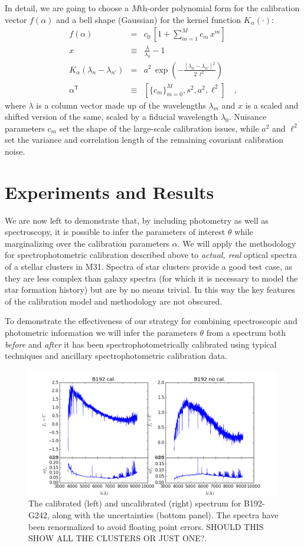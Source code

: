\documentclass[iop,numberedappendix]{emulateapj}
\newcommand{\transpose}[1]{{#1}^{\!\mathsf T}}
\newcommand{\excluster}{B192-G242}
\begin{document}
In detail, we are going to choose a $M$th-order polynomial form for
the calibration vector $f(\alpha)$ and a bell shape (Gaussian) for the
kernel function $K_\alpha(\cdot)$:
\begin{eqnarray}\displaystyle
f(\alpha) &=& c_0\,[1 + \sum_{m=1}^M c_m\,x^m]
\\
x &\equiv& \frac{\lambda}{\lambda_0} - 1
\\
K_\alpha(\lambda_n - \lambda_{n'}) &=& a^2\,\exp(-\frac{[\lambda_n - \lambda_{n'}]^2}{2\,\ell^2})
\\
\transpose{\alpha} &\equiv& \left[ \{c_m\}_{m=0}^M, s^2, a^2, \ell^2 \right]
\quad ,
\end{eqnarray}
where $\lambda$ is a column vector made up of the wavelengths $\lambda_m$
and $x$ is a scaled and shifted version of the same,
scaled by a fiducial wavelength $\lambda_0$.
Nuisance parameters $c_m$ set the shape of the large-scale calibration
issues, while $a^2$ and $\ell^2$ set the variance and correlation
length of the remaining covariant calibration noise.

\section{Experiments and Results}

We are now left to demonstrate that, by including photometry as well
as spectroscopy, it is possible to infer the parameters of interest
$\theta$ while marginalizing over the calibration parameters $\alpha$.
We will apply the methodology for spectrophotometric calibration
described above to \emph{actual, real} optical spectra of a stellar
clusters in M31.  Spectra of star clusters provide a good test case,
as they are less complex than galaxy spectra (for which it is
necessary to model the star formation history) but are by no means
trivial. In this way the key features of the calibration model and
methodology are not obscured.

To demonstrate the effectiveness of our strategy for combining
spectroscopic and photometric information we will infer the parameters
$\theta$ from a spectrum both \emph{before} and \emph{after} it has
been spectrophotometrically calibrated using typical techniques and
ancillary spectrophotometric calibration data.

\begin{figure}[h!]
\includegraphics[width = 0.5 \textwidth]{figures/dfig_b192-g242_020.png}
\caption{The calibrated (left) and uncalibrated (right) spectrum for
\excluster, along with the uncertainties (bottom panel). The spectra
have been renormalized to avoid floating point errors. {\color{blue}
SHOULD THIS SHOW ALL THE CLUSTERS OR JUST ONE?.}\label{fig:data}}
\end{figure}
\end{document}
